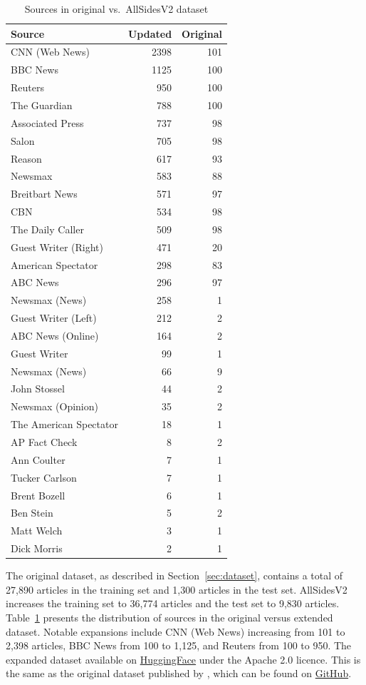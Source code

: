 \begin{table}[ht]
\centering
\small
\begin{tabular}{lrr}
\toprule
\textbf{Source} & \textbf{Updated} & \textbf{Original} \\
\midrule
CNN (Web News) & 2398 & 101 \\
BBC News & 1125 & 100 \\
Reuters & 950 & 100 \\
The Guardian & 788 & 100 \\
Associated Press & 737 & 98 \\
Salon & 705 & 98 \\
Reason & 617 & 93 \\
Newsmax & 583 & 88 \\
Breitbart News & 571 & 97 \\
CBN & 534 & 98 \\
The Daily Caller & 509 & 98 \\
Guest Writer (Right) & 471 & 20 \\
American Spectator & 298 & 83 \\
ABC News & 296 & 97 \\
Newsmax (News) & 258 & 1 \\
Guest Writer (Left) & 212 & 2 \\
ABC News (Online) & 164 & 2 \\
Guest Writer & 99 & 1 \\
Newsmax (News) & 66 & 9 \\
John Stossel & 44 & 2 \\
Newsmax (Opinion) & 35 & 2 \\
The American Spectator & 18 & 1 \\
AP Fact Check & 8 & 2 \\
Ann Coulter & 7 & 1 \\
Tucker Carlson & 7 & 1 \\
Brent Bozell & 6 & 1 \\
Ben Stein & 5 & 2 \\
Matt Welch & 3 & 1 \\
Dick Morris & 2 & 1 \\
\bottomrule
\end{tabular}
\caption{Sources in original vs.\ AllSidesV2 dataset}
\label{tab:sources_comparison}
\end{table}

The original dataset, as described in Section~\ref{sec:dataset}, contains a total of 27,890 articles in the training set and 1,300 articles in the test set. AllSidesV2 increases the training set to 36,774 articles and the test set to 9,830 articles. Table~\ref{tab:sources_comparison} presents the distribution of sources in the original versus extended dataset. Notable expansions include CNN (Web News) increasing from 101 to 2,398 articles, BBC News from 100 to 1,125, and Reuters from 100 to 950. The expanded dataset available on \href{https://huggingface.co/datasets/dragonslayer631/article-bias-prediction-media-splits-updated}{HuggingFace} under the Apache 2.0 licence. This is the same as the original dataset published by \citet{baly2020we}, which can be found on \href{https://github.com/ramybaly/Article-Bias-Prediction/tree/main?tab=readme-ov-file}{GitHub}.

